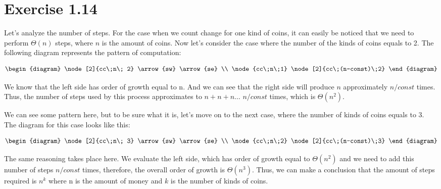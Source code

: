 \section{Exercise 1.14}

Let's analyze the number of steps. For the case when we count change for one kind of coins, it can easily be noticed that we need to perform $\Theta(n)$ steps, where $n$ is the amount of coins. Now let's consider the case where the number of the kinds of coins equals to 2. The following diagram represents the pattern of computation:

\[
	\begin{diagram}
		\node[2]{cc\;n\; 2} \arrow{sw}
		\arrow{se}
		\\
		\node{cc\;n\;1} \node[2]{cc\;(n-const)\;2}
	\end{diagram}
\]

We know that the left side has order of growth equal to n. And we can see that the right side will produce $n$ approximately $n/const$ times. Thus, the number of steps used by this process approximates to $n+n+n\dots$ $n/const$ times, which is $\Theta(n^2)$.

We can see some pattern here, but to be sure what it is, let's move on to the next case, where the number of kinds of coins equals to $3$. The diagram for this case looks like this:

\[
	\begin{diagram}
		\node[2]{cc\;n\; 3} \arrow{sw}
		\arrow{se}
		\\
		\node{cc\;n\;2} \node[2]{cc\;(n-const)\;3}
	\end{diagram}
\]

The same reasoning takes place here. We evaluate the left side, which has order of growth equal to $\Theta(n^2)$ and we need to add this number of steps $n/const$ times, therefore, the overall order of growth is $\Theta(n^3)$. Thus, we can make a conclusion that the amount of steps required is $n^k$ where n is the amount of money and $k$ is the number of kinds of coins.
